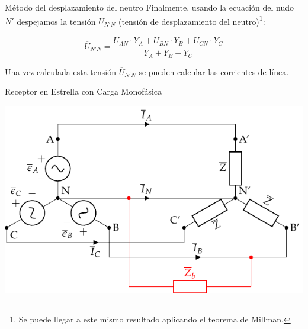 \documentclass[aspectratio=169, usenames,svgnames,dvipsnames]{beamer}
\begin{document}
\begin{frame}[label={sec:org3067831}]{Método del desplazamiento del neutro}
Finalmente, usando la ecuación del nudo \(N'\) despejamos la tensión \(U_{N'N}\) (tensión de desplazamiento del neutro)\footnote{Se puede llegar a este mismo resultado aplicando el teorema de Millman.}:

\[
  \boxed{\overline{U}_{N'N} = \frac{\overline{U}_{AN} \cdot \overline{Y}_A + \overline{U}_{BN} \cdot \overline{Y}_B + \overline{U}_{CN} \cdot \overline{Y}_C}{\overline{Y}_A + \overline{Y}_B + \overline{Y}_C}}
\]

Una vez calculada esta tensión \(\overline{U}_{N'N}\) se pueden calcular las corrientes de línea.
\end{frame}
\begin{frame}[label={sec:orgd08fbcc}]{Receptor en Estrella con Carga Monofásica}
\begin{center}
\includegraphics[height=0.9\textheight]{../figs/Estrella_CargaMonofasica.pdf}
\end{center}
\end{frame}
\end{document}
